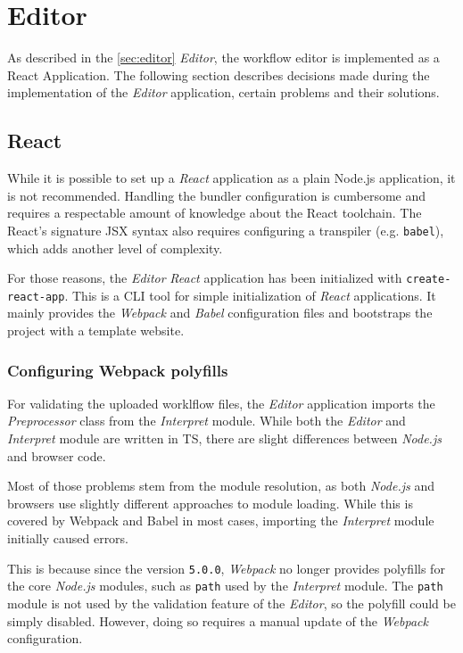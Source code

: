 \section{Editor}
As described in the \autoref{sec:editor} \textit{Editor}, the workflow editor is implemented as a React Application.
The following section describes decisions made during the implementation of the \textit{Editor} application,
certain problems and their solutions.

\subsection{React}
While it is possible to set up a \textit{React} application as a plain Node.js application, it is not recommended.
Handling the bundler configuration is cumbersome and requires a respectable amount of knowledge about the React toolchain.
The React's signature \acs{JSX} syntax also requires configuring a transpiler (e.g. \texttt{babel}), which adds another level of complexity.

For those reasons, the \textit{Editor} \textit{React} application has been initialized with \texttt{create-react-app}. 
This is a \ac{CLI} tool for simple initialization of \textit{React} applications.
It mainly provides the \textit{Webpack} and \textit{Babel} configuration files and bootstraps the project with a template website.

\subsubsection{Configuring Webpack polyfills}

For validating the uploaded worklflow files, the \textit{Editor} application imports the \textit{Preprocessor} class from the \textit{Interpret} module.
While both the \textit{Editor} and \textit{Interpret} module are written in \acl{TS}, there are slight differences between \textit{Node.js} and browser code.

Most of those problems stem from the module resolution, as both \textit{Node.js} and browsers use slightly different approaches to module loading.
While this is covered by Webpack and Babel in most cases, importing the \textit{Interpret} module initially caused errors.

This is because since the version \texttt{5.0.0}, \textit{Webpack} no longer provides polyfills for the core \textit{Node.js} modules, such as \texttt{path} used by the \textit{Interpret} module.
The \texttt{path} module is not used by the validation feature of the \textit{Editor}, so the polyfill could be simply disabled.
However, doing so requires a manual update of the \textit{Webpack} configuration.

